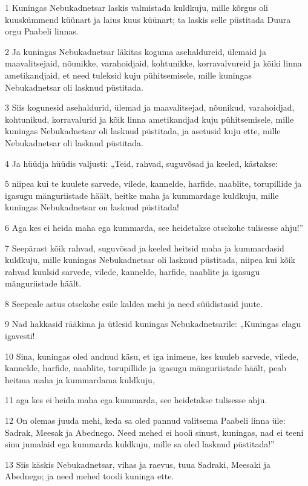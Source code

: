 \par 1 Kuningas Nebukadnetsar laskis valmistada kuldkuju, mille kõrgus oli kuuskümmend küünart ja laius kuus küünart; ta laskis selle püstitada Duura orgu Paabeli linnas.
\par 2 Ja kuningas Nebukadnetsar läkitas koguma asehaldureid, ülemaid ja maavalitsejaid, nõunikke, varahoidjaid, kohtunikke, korravalvureid ja kõiki linna ametikandjaid, et need tuleksid kuju pühitsemisele, mille kuningas Nebukadnetsar oli lasknud püstitada.
\par 3 Siis kogunesid asehaldurid, ülemad ja maavalitsejad, nõunikud, varahoidjad, kohtunikud, korravalurid ja kõik linna ametikandjad kuju pühitsemisele, mille kuningas Nebukadnetsar oli lasknud püstitada, ja asetusid kuju ette, mille Nebukadnetsar oli lasknud püstitada.
\par 4 Ja hüüdja hüüdis valjusti: „Teid, rahvad, suguvõsad ja keeled, kästakse:
\par 5 niipea kui te kuulete sarvede, vilede, kannelde, harfide, naablite, torupillide ja igasugu mänguriistade häält, heitke maha ja kummardage kuldkuju, mille kuningas Nebukadnetsar on lasknud püstitada!
\par 6 Aga kes ei heida maha ega kummarda, see heidetakse otsekohe tulisesse ahju!”
\par 7 Seepärast kõik rahvad, suguvõsad ja keeled heitsid maha ja kummardasid kuldkuju, mille kuningas Nebukadnetsar oli lasknud püstitada, niipea kui kõik rahvad kuulsid sarvede, vilede, kannelde, harfide, naablite ja igasugu mänguriistade häält.
\par 8 Seepeale astus otsekohe esile kaldea mehi ja need süüdistasid juute.
\par 9 Nad hakkasid rääkima ja ütlesid kuningas Nebukadnetsarile: „Kuningas elagu igavesti!
\par 10 Sina, kuningas oled andnud käsu, et iga inimene, kes kuuleb sarvede, vilede, kannelde, harfide, naablite, torupillide ja igasugu mänguriistade häält, peab heitma maha ja kummardama kuldkuju,
\par 11 aga kes ei heida maha ega kummarda, see heidetakse tulisesse ahju.
\par 12 On olemas juuda mehi, keda sa oled pannud valitsema Paabeli linna üle: Sadrak, Meesak ja Abednego. Need mehed ei hooli sinust, kuningas, nad ei teeni sinu jumalaid ega kummarda kuldkuju, mille sa oled lasknud püstitada!”
\par 13 Siis käskis Nebukadnetsar, vihas ja raevus, tuua Sadraki, Meesaki ja Abednego; ja need mehed toodi kuninga ette.
